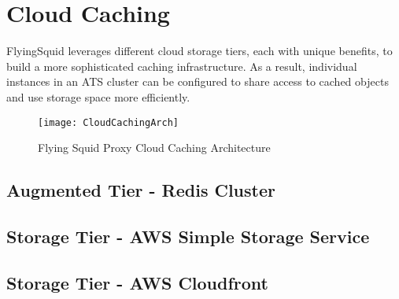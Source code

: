 \section{Cloud Caching}

FlyingSquid leverages different cloud storage tiers, each with unique benefits, to build a more sophisticated caching infrastructure. As a result, individual instances in an ATS cluster can be configured to share access to cached objects and use storage space more efficiently.

\begin{figure}[H] \centering
\texttt{[image: CloudCachingArch]}
\caption{Flying Squid Proxy Cloud Caching Architecture}
\end{figure}

\subsection{Augmented Tier - Redis Cluster}

\subsection{Storage Tier - AWS Simple Storage Service}

\subsection{Storage Tier - AWS Cloudfront}
